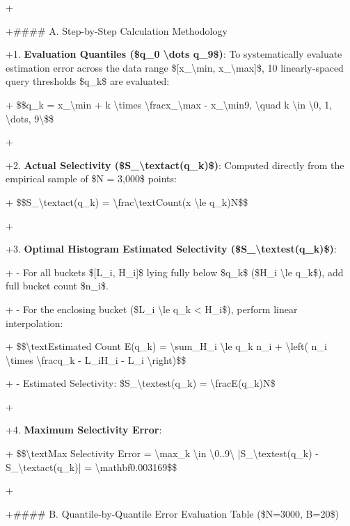 \documentclass[11pt,a4paper]{article}
\begin{document}
{{{+

+\#\#\#\# A. Step-by-Step Calculation Methodology

+1. \textbf{Evaluation Quantiles (\$q\_0 \textbackslash{}dots q\_9\$)}: To systematically evaluate estimation error across the data range \$[x\_{\textbackslash{}min}, x\_{\textbackslash{}max}]\$, 10 linearly-spaced query thresholds \$q\_k\$ are evaluated:

+   \$\$q\_k = x\_{\textbackslash{}min} + k \textbackslash{}times \textbackslash{}frac{x\_{\textbackslash{}max} - x\_{\textbackslash{}min}}{9}, \textbackslash{}quad k \textbackslash{}in \textbackslash{}{0, 1, \textbackslash{}dots, 9\textbackslash{}}\$\$

+

+2. \textbf{Actual Selectivity (\$S\_{\textbackslash{}text{act}}(q\_k)\$)}: Computed directly from the empirical sample of \$N = 3,000\$ points:

+   \$\$S\_{\textbackslash{}text{act}}(q\_k) = \textbackslash{}frac{\textbackslash{}text{Count}(x \textbackslash{}le q\_k)}{N}\$\$

+

+3. \textbf{Optimal Histogram Estimated Selectivity (\$S\_{\textbackslash{}text{est}}(q\_k)\$)}:

+   - For all buckets \$[L\_i, H\_i]\$ lying fully below \$q\_k\$ (\$H\_i \textbackslash{}le q\_k\$), add full bucket count \$n\_i\$.

+   - For the enclosing bucket (\$L\_i \textbackslash{}le q\_k < H\_i\$), perform linear interpolation:

+     \$\$\textbackslash{}text{Estimated Count } E(q\_k) = \textbackslash{}sum\_{H\_i \textbackslash{}le q\_k} n\_i + \textbackslash{}left( n\_i \textbackslash{}times \textbackslash{}frac{q\_k - L\_i}{H\_i - L\_i} \textbackslash{}right)\$\$

+   - Estimated Selectivity: \$S\_{\textbackslash{}text{est}}(q\_k) = \textbackslash{}frac{E(q\_k)}{N}\$

+

+4. \textbf{Maximum Selectivity Error}:

+   \$\$\textbackslash{}text{Max Selectivity Error} = \textbackslash{}max\_{k \textbackslash{}in \textbackslash{}{0..9\textbackslash{}}} |S\_{\textbackslash{}text{est}}(q\_k) - S\_{\textbackslash{}text{act}}(q\_k)| = \textbackslash{}mathbf{0.003169}\$\$

+

+\#\#\#\# B. Quantile-by-Quantile Error Evaluation Table (\$N=3000, B=20\$)

}}}
\end{document}
